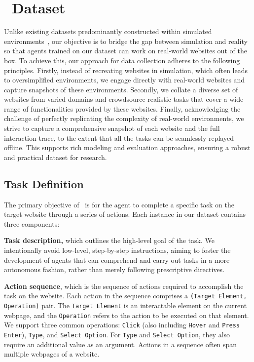 \section{\mind\ Dataset}

Unlike existing datasets predominantly constructed within simulated environments~\cite{shiWorldBitsOpenDomain2017, yaoWebShopScalableRealWorld2022}, our objective is to bridge the gap between simulation and reality so that agents trained on our dataset can work on real-world websites out of the box.
To achieve this, our approach for data collection adheres to the following principles. 
Firstly, instead of recreating websites in simulation, which often leads to oversimplified environments, we engage directly with real-world websites and capture snapshots of these environments.
Secondly, we collate a diverse set of websites from varied domains and crowdsource realistic tasks that cover a wide range of functionalities provided by these websites.
Finally, acknowledging the challenge of perfectly replicating the complexity of real-world environments, we strive to capture a comprehensive snapshot of each website and the full interaction trace, to the extent that all the tasks can be seamlessly replayed offline. This supports rich modeling and evaluation approaches, ensuring a robust and practical dataset for research.

\subsection{Task Definition}
The primary objective of \mind\ is for the agent to complete a specific task on the target website through a series of actions. Each instance in our dataset contains three components:

\noindent\textbf{Task description,} which outlines the high-level goal of the task. We intentionally avoid low-level, step-by-step instructions, aiming to foster the development of agents that can comprehend and carry out tasks in a more autonomous fashion, rather than merely following prescriptive directives.

\noindent\textbf{Action sequence}, which is the sequence of actions required to accomplish the task on the website. Each action in the sequence comprises a \texttt{(Target Element, Operation)} pair. The \texttt{Target Element} is an interactable element on the current webpage, and the \texttt{Operation} refers to the action to be executed on that element. We support three common operations: \texttt{Click} (also including \texttt{Hover} and \texttt{Press Enter}), \texttt{Type}, and \texttt{Select Option}. For \texttt{Type} and \texttt{Select Option}, they also require an additional value as an argument.
Actions in a sequence often span multiple webpages of a website.

